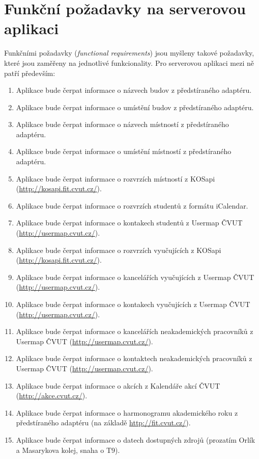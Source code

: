\section{Funkční požadavky na serverovou aplikaci}
Funkčními požadavky (\textit{functional requirements}) jsou myšleny takové požadavky, které jsou zaměřeny na jednotlivé funkcionality. Pro serverovou aplikaci mezi ně patří především:
\begin{enumerate}
 \item Aplikace bude čerpat informace o názvech budov z předstíraného adaptéru.
 \item Aplikace bude čerpat informace o umístění budov z předstíraného adaptéru.
 \item Aplikace bude čerpat informace o názvech místností z předstíraného adaptéru.
 \item Aplikace bude čerpat informace o umístění místností z předstíraného adaptéru.
 \item Aplikace bude čerpat informace o rozvrzích místností z KOSapi (\url{http://kosapi.fit.cvut.cz/}). 
 \item Aplikace bude čerpat informace o rozvrzích studentů z formátu iCalendar.
 \item Aplikace bude čerpat informace o kontakech studentů z Usermap ČVUT (\url{http://usermap.cvut.cz/}).
 \item Aplikace bude čerpat informace o rozvrzích vyučujících z KOSapi (\url{http://kosapi.fit.cvut.cz/}). 
 \item Aplikace bude čerpat informace o kancelářích vyučujících z Usermap ČVUT (\url{http://usermap.cvut.cz/}).
 \item Aplikace bude čerpat informace o kontakech vyučujících z Usermap ČVUT (\url{http://usermap.cvut.cz/}).
 \item Aplikace bude čerpat informace o kancelářích neakademických pracovníků z Usermap ČVUT (\url{http://usermap.cvut.cz/}).
 \item Aplikace bude čerpat informace o kontaktech neakademických pracovníků z Usermap ČVUT (\url{http://usermap.cvut.cz/}).
 \item Aplikace bude čerpat informace o akcích  z Kalendáře akcí ČVUT (\url{http://akce.cvut.cz/}).
 \item Aplikace bude čerpat informace o harmonogramu akademického roku z předstíraného adaptéru (na základě \url{http://fit.cvut.cz/}).
 \item Aplikace bude čerpat informace o datech  dostupných zdrojů (prozatím Orlík a Masarykova kolej, snaha o T9).

\end{enumerate}
